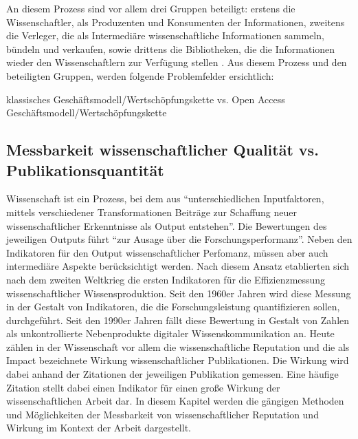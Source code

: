 An diesem Prozess sind vor allem drei Gruppen beteiligt: erstens die Wissenschaftler, als Produzenten und Konsumenten der Informationen, zweitens die Verleger, die als Intermediäre wissenschaftliche Informationen sammeln, bündeln und verkaufen, sowie drittens die Bibliotheken, die die Informationen wieder den Wissenschaftlern zur Verfügung stellen \cite{Odlyzko_1997}. Aus diesem Prozess und den beteiligten Gruppen, werden folgende Problemfelder ersichtlich:


klassisches Geschäftsmodell/Wertschöpfungskette vs. Open Access Geschäftsmodell/Wertschöpfungskette \cite{Hess_2006}

\subsection{Messbarkeit wissenschaftlicher Qualität vs. Publikationsquantität}
Wissenschaft ist ein Prozess, bei dem aus “unterschiedlichen Inputfaktoren, mittels verschiedener Transformationen Beiträge zur Schaffung neuer wissenschaftlicher Erkenntnisse als Output entstehen”\cite{Jansen_2007}. Die Bewertungen des jeweiligen Outputs führt “zur Ausage über die Forschungsperformanz”. Neben den Indikatoren für den Output wissenschaftlicher Perfomanz, müssen aber auch intermediäre Aspekte berücksichtigt werden\cite{schmoch_2009}. Nach diesem Ansatz etablierten sich nach dem zweiten Weltkrieg die ersten Indikatoren für die Effizienzmessung wissenschaftlicher Wissensproduktion. Seit den 1960er Jahren wird diese Messung in der Gestalt von Indikatoren, die die Forschungsleistung quantifizieren sollen, durchgeführt. Seit den 1990er Jahren fällt diese Bewertung in Gestalt von Zahlen als unkontrollierte Nebenprodukte digitaler Wissenskommunikation an\cite{angermueller_2010}. Heute zählen in der Wissenschaft vor allem die wissenschaftliche Reputation und die als Impact bezeichnete Wirkung wissenschaftlicher Publikationen\cite{herb_open_2013}. Die Wirkung wird dabei anhand der Zitationen der jeweiligen Publikation gemessen. Eine häufige Zitation stellt dabei einen Indikator für einen große Wirkung der wissenschaftlichen Arbeit dar. In diesem Kapitel werden die gängigen Methoden und Möglichkeiten der Messbarkeit von wissenschaftlicher Reputation und Wirkung im Kontext der Arbeit dargestellt.
